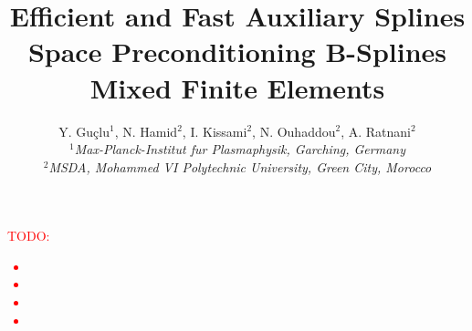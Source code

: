 \documentclass[11pt]{article}
\title{Efficient and Fast Auxiliary Splines Space Preconditioning B-Splines Mixed Finite Elements}
\author{Y. Gu\c{c}lu$^{1}$, N. Hamid$^{2}$, I. Kissami$^{2}$, N. Ouhaddou$^{2}$, A. Ratnani$^{2}$ 
\\
\small{\textit{$^1$Max-Planck-Institut fur Plasmaphysik, Garching, Germany}}
\\
\small{\textit{$^2$MSDA, Mohammed VI Polytechnic University, Green City, Morocco}}
}
\begin{document}
\maketitle

\begin{abstract}

\end{abstract}

\textcolor{red}{TODO: 
  \begin{itemize}
    \item   
    \item   
    \item   
    \item   
  \end{itemize}
}

\newpage
\tableofcontents
\newpage






\newpage

\clearpage


\clearpage
\newpage



%
\end{document}
